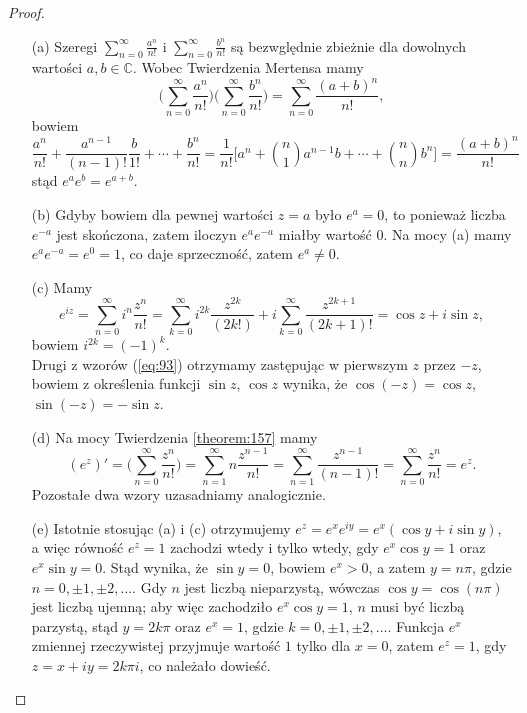 \documentclass[leqno]{article}
\begin{document}
\begin{justify}
\begin{proof}
    \begin{itemize}
        \item [(a)]
            Szeregi $\sum\limits_{n=0}^{\infty}\frac{a^n}{n!}$ i $\sum\limits_{n=0}^{\infty}\frac{b^n}{n!}$
            są bezwględnie zbieżnie dla dowolnych wartości $a, b \in \mathbb{C}$. Wobec Twierdzenia Mertensa mamy
            \[
                \Bigg(\sum_{n=0}^{\infty}\frac{a^n}{n!}\Bigg)\Bigg(\sum_{n=0}^{\infty}\frac{b^n}{n!}\Bigg) = 
                \sum_{n=0}^{\infty}\frac{{(a+b)}^n}{n!},
            \]
            bowiem
            \[
                \frac{a^n}{n!} + \frac{a^{n-1}}{(n-1)!}\frac{b}{1!} + \cdots + \frac{b^n}{n!} = \frac{1}{n!}\Bigg[
                    a^n + \binom{n}{1}a^{n-1}b + \cdots + \binom{n}{n}b^n    
                \Bigg] = \frac{{(a+b)}^n}{n!}
            \]
            stąd $e^a e^b = e^{a+b}$.
        \item [(b)]
            Gdyby bowiem dla pewnej wartości $z = a$ było $e^a = 0$, to ponieważ liczba $e^{-a}$ jest skończona, zatem iloczyn
            $e^a e^{-a}$ miałby wartość $0$. Na mocy (a) mamy $e^a e^{-a} = e^0 = 1$, co daje sprzeczność, zatem $e^a \neq 0$.
        \item [(c)]
            Mamy 
            \[
                e^{iz} = \sum_{n=0}^{\infty}i^n \frac{z^n}{n!} = \sum_{k=0}^{\infty} i^{2k}\frac{z^{2k}}{(2k!)} + i\sum_{k=0}^{\infty}\frac{z^{2k+1}}{(2k+1)!} = \cos z + i \sin z,
            \]
            bowiem $i^{2k} = {(-1)}^k$. \\
            Drugi z wzorów (\ref{eq:93}) otrzymamy zastępując w pierwszym $z$ przez $-z$, bowiem z określenia funkcji $\sin z$, $\cos z$ wynika, że
            $\cos(-z) = \cos z$, $\sin(-z) = - \sin z$.
        \item [(d)]
            Na mocy Twierdzenia \ref{theorem:157} mamy
            \[
                (e^z)' = \Bigg(\sum_{n=0}^{\infty}\frac{z^n}{n!}\Bigg)
                = \sum_{n=1}^{\infty}n\frac{z^{n-1}}{n!}
                = \sum_{n=1}^{\infty}\frac{z^{n-1}}{(n-1)!} = \sum_{n=0}^{\infty}\frac{z^n}{n!} = e^z.
            \]
            Pozostałe dwa wzory uzasadniamy analogicznie.
        \item [(e)]
            Istotnie stosując (a) i (c) otrzymujemy $e^z = e^x e^{iy} = e^x(\cos y + i\sin y)$, a więc
            równość $e^z = 1$ zachodzi wtedy i tylko wtedy, gdy $e^x \cos y = 1$ oraz $e^x \sin y = 0$.
            Stąd wynika, że $\sin y = 0$, bowiem $e^x > 0$, a zatem $y = n\pi$, gdzie $n = 0, \pm 1, \pm 2, \ldots$.
            Gdy $n$ jest liczbą nieparzystą, wówczas $\cos y = \cos (n\pi)$ jest liczbą ujemną; aby więc zachodziło $e^x \cos y = 1$, $n$ musi
            być liczbą parzystą, stąd $y = 2k\pi$ oraz $e^x = 1$, gdzie $k = 0, \pm 1, \pm 2, \ldots$. Funkcja $e^x$
            zmiennej rzeczywistej przyjmuje wartość $1$ tylko dla $x = 0$, zatem $e^z = 1$, gdy $z = x + iy = 2k\pi i$, co należało dowieść.
    \end{itemize}
\end{proof}


\end{justify}
\end{document}

